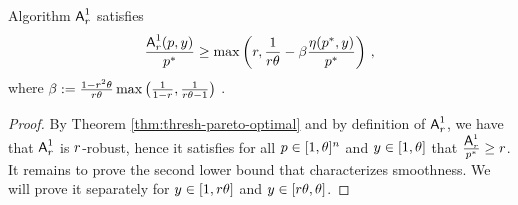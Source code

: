 \begin{lemma}\label{lem:A1-smoothness-ADD}
Algorithm $\mbox{\textup{\textsf{A}}}^1_r$ satisfies
\begin{align}
    \frac{\mbox{\textup{\textsf{A}}}^1_r(p, y)}{p^*} \geq \max\left( r, \frac{1}{r \theta}-\beta\frac{\eta(p^*, y)}{p^*}\right)\,,\label{eq: [deterministic Pareto-Optimal smooth Algorithm/ THM additive smoothness] PR bound}
    \end{align}
where $\beta:= \frac{1-r^2\theta}{r \theta} \max\big( \frac{1}{1-r}, \frac{1}{r \theta - 1} \big)\;$.
\end{lemma}


\begin{proof}
By Theorem \ref{thm:thresh-pareto-optimal} and by definition of $\mbox{\textup{\textsf{A}}}^1_r$, we have that $\mbox{\textup{\textsf{A}}}^1_r$ is $r$-robust, hence it satisfies for all $p \in [1,\theta]^n$ and $y \in [1,\theta]$ that 
$\frac{\mbox{\textup{\textsf{A}}}^1_r}{p^*} \geq r$. It remains to prove the second lower bound that characterizes smoothness. We will prove it separately for $y \in [1,r \theta]$ and $y \in [r \theta, \theta]$.


\end{proof}
